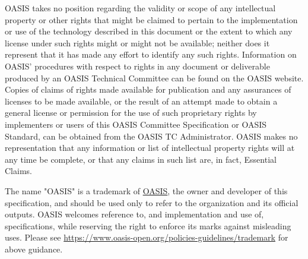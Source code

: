 \begin{titlepage}
OASIS takes no position regarding the validity or scope of any
intellectual property or other rights that might be claimed to pertain
to the implementation or use of the technology described in this
document or the extent to which any license under such rights might or
might not be available; neither does it represent that it has made any
effort to identify any such rights. Information on OASIS' procedures
with respect to rights in any document or deliverable produced by an
OASIS Technical Committee can be found on the OASIS website. Copies of
claims of rights made available for publication and any assurances of
licenses to be made available, or the result of an attempt made to
obtain a general license or permission for the use of such proprietary
rights by implementers or users of this OASIS Committee Specification
or OASIS Standard, can be obtained from the OASIS TC Administrator.
OASIS makes no representation that any information or list of
intellectual property rights will at any time be complete, or that any
claims in such list are, in fact, Essential Claims.

The name "OASIS" is a trademark of \href{https://www.oasis-open.org/}{OASIS}, the owner and developer of
this specification, and should be used only to refer to the
organization and its official outputs. OASIS welcomes reference to,
and implementation and use of, specifications, while reserving the
right to enforce its marks against misleading uses. Please see
\url{https://www.oasis-open.org/policies-guidelines/trademark} for above guidance.
\\\\

\end{titlepage}
